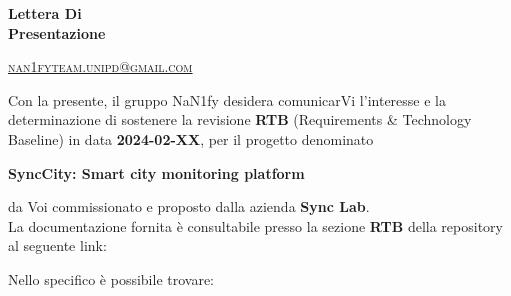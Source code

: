 \documentclass[8pt]{article}
\begin{document}
\begin{titlepage}
\begin{minipage}[t]{0.47\textwidth}
{		}
		\vspace{4mm}\vspace{4mm}
	\end{minipage}
	\vspace{4cm}
	\begin{center}
		\begin{flushright}
			{\fontsize{30pt}{52pt}\selectfont \textbf{Lettera Di \\Presentazione\\}} %
		\end{flushright}
		\vspace{3cm}
	\end{center}
	\vspace{8.5 cm}
	{\small \textsc{\href{mailto: nan1fyteam.unipd@gmail.com}{nan1fyteam.unipd@gmail.com}}}
\end{titlepage}
\pagestyle{mystyle}
\newpage
Con la presente, il gruppo NaN1fy desidera comunicarVi l'interesse e la determinazione di sostenere
la revisione \textbf{RTB} (Requirements \& Technology Baseline) in data \textbf{2024-02-XX}, per il
progetto denominato\\
\begin{center}
	\textbf{SyncCity: Smart city monitoring platform}
\end{center}
da Voi commissionato e proposto dalla azienda \textbf{Sync Lab}.
\vspace{1em}
\\La documentazione fornita è consultabile presso la sezione \textbf{RTB} della repository al seguente link:
\begin{center}
	\textbf{\href{https://github.com/NaN1fy/docs/tree/main/documents/RTB}{\color{myblue}{https://github.com/NaN1fy/docs/tree/main/documents/RTB}}}
\end{center}
Nello specifico è possibile trovare:
\end{document}
